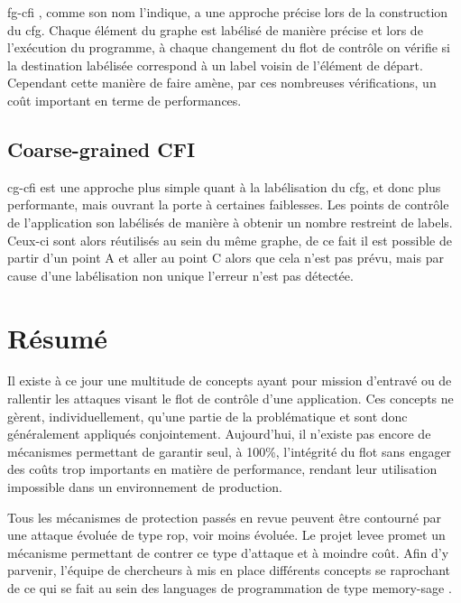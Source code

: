 \og \gls{fg-cfi} \fg \cite{FineCFI, FineCFIKernel}, comme son nom l'indique, a une approche précise lors de la construction du \gls{cfg}. Chaque élément du graphe est labélisé de manière précise et lors de l'exécution du programme, à chaque changement du flot de contrôle on vérifie si la destination labélisée correspond à un label voisin de l'élément de départ. Cependant cette manière de faire amène, par ces nombreuses vérifications, un coût important en terme de performances.

\subsection{Coarse-grained CFI}

\og \gls{cg-cfi} \fg est une approche plus simple quant à la labélisation du \gls{cfg},  et donc plus performante, mais ouvrant la porte à certaines faiblesses. Les points de contrôle de l'application son labélisés de manière à obtenir un nombre restreint de labels. Ceux-ci sont alors réutilisés au sein du même graphe, de ce fait il est possible de partir d'un point A et aller au point C alors que cela n'est pas prévu, mais par cause d'une labélisation non unique l'erreur n'est pas détectée.

\newpage

\section{Résumé}

Il existe à ce jour une multitude de concepts ayant pour mission d'entravé ou de rallentir les attaques visant le flot de contrôle d'une application. Ces concepts ne gèrent, individuellement, qu'une partie de la problématique et sont donc généralement appliqués conjointement. Aujourd'hui, il n'existe pas encore de mécanismes permettant de garantir seul, à 100\%, l'intégrité du flot sans engager des coûts trop importants en matière de performance, rendant leur utilisation impossible dans un environnement de production.

Tous les mécanismes de protection passés en revue peuvent être contourné par une attaque évoluée de type \gls{rop}, voir moins évoluée. Le projet \gls{levee} promet un mécanisme permettant de contrer ce type d'attaque et à moindre coût. Afin d'y parvenir, l'équipe de chercheurs à mis en place différents concepts se raprochant de ce qui se fait au sein des languages de programmation de type \og memory-sage \fg.


